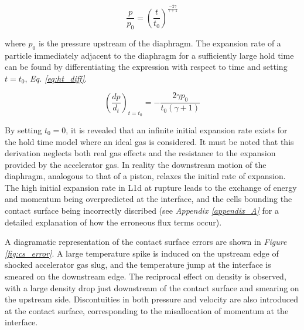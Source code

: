 \documentclass[a4paper,10pt]{article}
\begin{document}
\par

\begin{equation}
\frac{p}{p_{0}} = \left ( \frac{t}{t_{0}} \right ) ^{ \frac{-2 \gamma }{ \gamma + 1 }} \label{hold_time}
\end{equation}

where $p_{0}$ is the pressure upstream of the diaphragm.  The expansion rate of a particle
immediately adjacent to the diaphragm for a sufficiently large
hold time can be found by differentiating the expression with
respect to time and setting $t=t_{0}$, \emph{Eq. \ref{eq:ht_diff}}.

\begin{equation}
\left ( \frac{dp}{d_{t}} \right )_{t=t_{0}} = -\frac{2 \gamma p_{0}}{t_{0}(\gamma + 1)} \label{eq:ht_diff}
\end{equation}

By setting $t_{0}=0$, it is revealed that an infinite initial
expansion rate exists for the hold time model where an ideal gas
is considered.  It must be noted that this derivation neglects both real gas effects and the resistance to the expansion provided by the accelerator gas.  In reality the downstream motion of the diaphragm, analogous to that of a piston, relaxes the initial rate of expansion.  The high initial expansion rate in L1d at rupture leads to the exchange of energy and momentum being overpredicted at the interface, and the cells bounding the contact surface being incorrectly discribed (see \emph{Appendix \ref{appendix_A}} for a detailed explanation of how the erroneous flux terms occur).

\par \medskip

A diagramatic representation of the contact surface errors are shown in \emph{Figure \ref{fig:cs_error}}.  A large temperature spike is induced on the upstream edge of shocked accelerator gas slug, and the temperature jump at the interface is smeared on the downstream edge.  The reciprocal effect on density is observed, with a large density drop just downstream of the contact surface and smearing on the upstream side.  Discontuities in both pressure and velocity are also introduced at the contact surface, corresponding to the misallocation of momentum at the interface.
\end{document}
